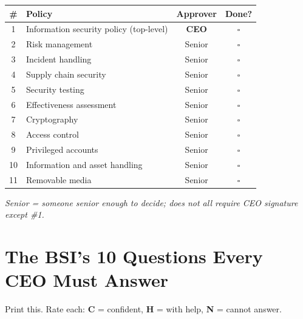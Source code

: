 \documentclass[11pt,a4paper,twoside]{book}
\begin{document}
\begin{center}
\renewcommand{\arraystretch}{1.4}
\begin{tabularx}{\linewidth}{@{}cXcc@{}}
\toprule
\textbf{\#} & \textbf{Policy} & \textbf{Approver} & \textbf{Done?} \\
\midrule
1 & Information security policy (top-level) & \textbf{CEO} & $\square$ \\
2 & Risk management & Senior & $\square$ \\
3 & Incident handling & Senior & $\square$ \\
4 & Supply chain security & Senior & $\square$ \\
5 & Security testing & Senior & $\square$ \\
6 & Effectiveness assessment & Senior & $\square$ \\
7 & Cryptography & Senior & $\square$ \\
8 & Access control & Senior & $\square$ \\
9 & Privileged accounts & Senior & $\square$ \\
10 & Information and asset handling & Senior & $\square$ \\
11 & Removable media & Senior & $\square$ \\
\bottomrule
\end{tabularx}
\end{center}

\textit{Senior = someone senior enough to decide; does not all require CEO signature except \#1.}

\chapter{The BSI's 10 Questions Every CEO Must Answer}

Print this. Rate each: \textbf{C} = confident, \textbf{H} = with help, \textbf{N} = cannot answer.
\end{document}
